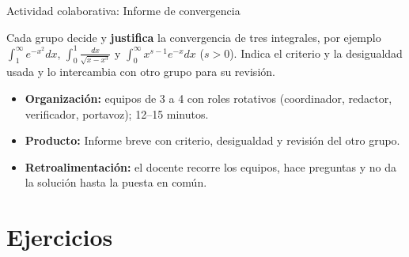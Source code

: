 \documentclass[10pt,aspectratio=169]{beamer}
\begin{document}
\begin{frame}{Actividad colaborativa: Informe de convergencia}
  \small
  \begin{activa}
    Cada grupo decide y \textbf{justifica} la convergencia de tres integrales, por ejemplo $\int_1^\infty e^{-x^2}dx$, $\int_0^1\frac{dx}{\sqrt{x-x^3}}$ y $\int_0^\infty x^{s-1}e^{-x}dx$ ($s>0$). Indica el criterio y la desigualdad usada y lo intercambia con otro grupo para su revisión.
  \end{activa}
  \begin{itemize}
    \item \textbf{Organización:} equipos de 3 a 4 con roles rotativos (coordinador, redactor, verificador, portavoz); 12--15 minutos.
    \item \textbf{Producto:} Informe breve con criterio, desigualdad y revisión del otro grupo.
    \item \textbf{Retroalimentación:} el docente recorre los equipos, hace preguntas y no da la solución hasta la puesta en común.
  \end{itemize}
\end{frame}

\section{Ejercicios}
\end{document}
